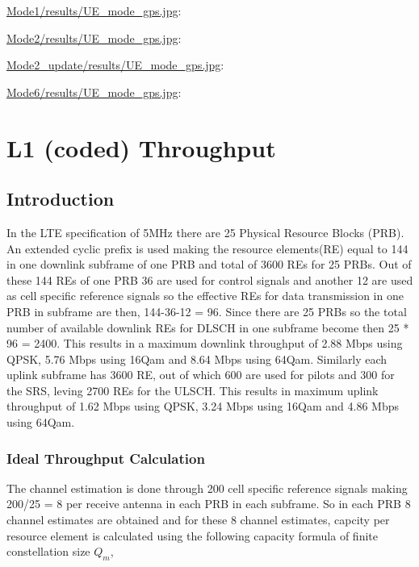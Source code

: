 \documentclass[a4paper,10pt]{article}
\newcommand{\printfile}[2][]{
 \begin{minipage}{8cm}
  \centering
  \url{#2}: #1

 \end{minipage}
}
\begin{document}
\printfile{Mode1/results/UE_mode_gps.jpg}
\printfile{Mode2/results/UE_mode_gps.jpg}

\printfile{Mode2_update/results/UE_mode_gps.jpg}
\printfile{Mode6/results/UE_mode_gps.jpg}

\section{L1 (coded) Throughput}


\subsection{Introduction}


In the LTE specification of 5MHz there are 25 Physical Resource Blocks (PRB). An extended cyclic prefix is used making the resource elements(RE) equal to 144 in one downlink subframe of one PRB and total of 3600 REs for 25 PRBs. Out of these 144 REs of one PRB 36 are used for control signals and another 12 are used as cell specific reference signals so the effective REs for data transmission in one PRB in subframe are then, 144-36-12 = 96. Since there are 25 PRBs so the total number of available downlink REs for DLSCH in one subframe become then 25 * 96 = 2400. This results in a maximum downlink throughput of 2.88 Mbps using QPSK, 5.76 Mbps using 16Qam and 8.64 Mbps using 64Qam. Similarly each uplink subframe has 3600 RE, out of which 600 are used for pilots and 300 for the SRS, leving 2700 REs for the ULSCH. This results in maximum uplink throughput of 1.62 Mbps using QPSK, 3.24 Mbps using 16Qam and 4.86 Mbps using 64Qam. 

\subsubsection{Ideal Throughput Calculation}
The channel estimation is done through 200 cell specific reference signals making 200/25 = 8 per receive antenna in each PRB in each subframe. So in each PRB 8 channel estimates are obtained and for these 8 channel estimates, capcity per resource element is calculated using the following capacity formula of finite constellation size $Q_{m}$,

 
\end{document}
